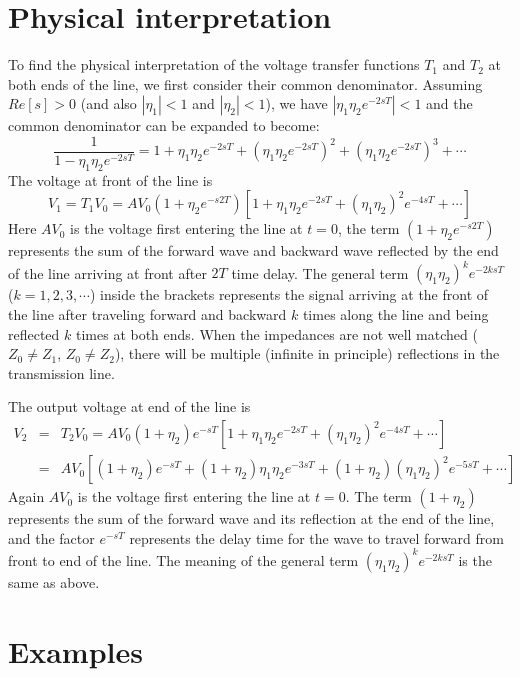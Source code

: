 \section*{Physical interpretation}

To find the physical interpretation of the voltage transfer functions
$T_1$ and $T_2$ at both ends of the line, we first consider their common
denominator. Assuming $Re[s]>0$ (and also $|\eta_1|<1$ and $|\eta_2|<1$), 
we have $|\eta_1\eta_2e^{-2sT}|<1$ and the common denominator can be 
expanded to become:
\[	\frac{1}{1-\eta_1\eta_2e^{-2sT}}=1+\eta_1\eta_2e^{-2sT}
	+(\eta_1\eta_2e^{-2sT})^2+(\eta_1\eta_2e^{-2sT})^3+\cdots 
\]
The voltage at front of the line is
\[ V_1=T_1V_0=AV_0(1+\eta_2e^{-s2T})[1+\eta_1\eta_2e^{-2sT}
	+(\eta_1\eta_2)^2e^{-4sT}+\cdots ]	\]
Here $AV_0$ is the voltage first entering the line at $t=0$, the term 
$(1+\eta_2 e^{-s2T})$ represents the sum of the forward wave and backward
wave reflected by the end of the line arriving at front after $2T$ time
delay. The general term $(\eta_1\eta_2)^ke^{-2ksT}$ ($k=1,2,3, \cdots$) 
inside the brackets represents the signal arriving at the front of the line
after traveling forward and backward $k$ times along the line and being 
reflected $k$ times at both ends. When the impedances are not well matched 
($Z_0\ne Z_1$, $Z_0\ne Z_2$), there will be multiple (infinite in principle)
reflections in the transmission line.

The output voltage at end of the line is 
\begin{eqnarray}
V_2 &=& T_2V_0=AV_0(1+\eta_2)e^{-sT}[1+\eta_1\eta_2e^{-2sT}
	+(\eta_1\eta_2)^2e^{-4sT}+\cdots ]
	\nonumber \\
 &=& AV_0 [ (1+\eta_2)e^{-sT}+(1+\eta_2)\eta_1\eta_2e^{-3sT}+
	(1+\eta_2)(\eta_1\eta_2)^2e^{-5sT}+ \cdots ]
	\nonumber 
\end{eqnarray}
Again $AV_0$ is the voltage first entering the line at $t=0$. The term 
$(1+\eta_2)$ represents the sum of the forward wave and its reflection at
the end of the line, and the factor $e^{-sT}$ represents the delay time for 
the wave to travel forward from front to end of the line. The meaning of the
general term $(\eta_1\eta_2)^ke^{-2ksT}$ is the same as above. 

\newpage
\section*{Examples}

